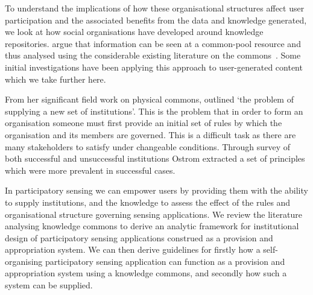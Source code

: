 To understand the implications of how these organisational structures affect user participation and the associated benefits from the data and knowledge generated, we look at how social organisations have developed around knowledge repositories.
\citet{Ostrom2003} argue that information can be seen at a common-pool resource and thus analysed using the considerable existing literature on the commons~\citep{Hess2007}. 
Some initial investigations have been applying this approach to user-generated content~\citep{Pitt2012} which we take further here.

From her significant field work on physical commons, \citet[p.42]{Ostrom1990} outlined `the problem of supplying a new set of institutions'. 
This is the problem that in order to form an organisation someone must first provide an initial set of rules by which the organisation and its members are governed.
This is a difficult task as there are many stakeholders to satisfy under changeable conditions. Through survey of both successful and unsuccessful institutions Ostrom extracted a set of principles which were more prevalent in successful cases.

In participatory sensing we can empower users by providing them with the ability to supply institutions, and the knowledge to assess the effect of the rules and organisational structure governing sensing applications. 
We review the literature analysing knowledge commons to derive an analytic framework for institutional design of participatory sensing applications construed as a provision and appropriation system.  %
We can then derive guidelines for firstly how a self-organising participatory sensing application can function as a provision and appropriation system using a knowledge commons, and secondly how such a system can be supplied.


